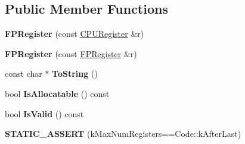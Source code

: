 \subsection*{Public Member Functions}
\begin{DoxyCompactItemize}
\item 
{\bfseries F\+P\+Register} (const \hyperlink{structv8_1_1internal_1_1_c_p_u_register}{C\+P\+U\+Register} \&r)\hypertarget{structv8_1_1internal_1_1_f_p_register_afd6ba66ef3a227a8c4dd34d35fbd52d6}{}\label{structv8_1_1internal_1_1_f_p_register_afd6ba66ef3a227a8c4dd34d35fbd52d6}

\item 
{\bfseries F\+P\+Register} (const \hyperlink{structv8_1_1internal_1_1_f_p_register}{F\+P\+Register} \&r)\hypertarget{structv8_1_1internal_1_1_f_p_register_a4ca97939fe4c9b000035bd17cddf4990}{}\label{structv8_1_1internal_1_1_f_p_register_a4ca97939fe4c9b000035bd17cddf4990}

\item 
const char $\ast$ {\bfseries To\+String} ()\hypertarget{structv8_1_1internal_1_1_f_p_register_acf2c4e41d727e2387ca703e9a76c6363}{}\label{structv8_1_1internal_1_1_f_p_register_acf2c4e41d727e2387ca703e9a76c6363}

\item 
bool {\bfseries Is\+Allocatable} () const \hypertarget{structv8_1_1internal_1_1_f_p_register_a152ed57dc754904e1a3582f9a274c398}{}\label{structv8_1_1internal_1_1_f_p_register_a152ed57dc754904e1a3582f9a274c398}

\item 
bool {\bfseries Is\+Valid} () const \hypertarget{structv8_1_1internal_1_1_f_p_register_a547defad12f374f3ac8302be70346703}{}\label{structv8_1_1internal_1_1_f_p_register_a547defad12f374f3ac8302be70346703}

\item 
{\bfseries S\+T\+A\+T\+I\+C\+\_\+\+A\+S\+S\+E\+RT} (k\+Max\+Num\+Registers==Code\+::k\+After\+Last)\hypertarget{structv8_1_1internal_1_1_f_p_register_aad0b132deac0deefb2c75b0944cb4884}{}\label{structv8_1_1internal_1_1_f_p_register_aad0b132deac0deefb2c75b0944cb4884}

\end{DoxyCompactItemize}
